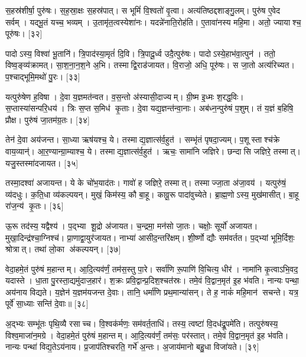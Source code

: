 स॒हस्र॑शीर्\mbox{}षा॒ पुरु॑षः। स॒ह॒स्रा॒क्षः स॒हस्र॑पात्। स भूमिं॑ वि॒श्वतो॑ वृ॒त्वा। अत्य॑तिष्ठद्दशाङ्गु॒लम्। पुरु॑ष ए॒वेद सर्वम्। यद्भू॒तं यच्च॒ भव्यम्। उ॒तामृ॑त॒त्वस्येशा॑नः। यदन्ने॑नाति॒रोह॑ति। ए॒तावा॑नस्य महि॒मा। अतो॒ ज्यायाश्च॒ पूरु॑षः। [३२]

पादोऽस्य॒ विश्वा॑ भू॒तानि॑। त्रि॒पाद॑स्या॒मृतं॑ दि॒वि। त्रि॒पादू॒र्ध्व उदै॒त्पुरु॑षः। पादोऽस्ये॒हाभ॑वा॒त्पुन॑। ततो॒ विष्व॒ङ्व्य॑क्रामत्। सा॒श॒ना॒न॒श॒ने अ॒भि। तस्माद्वि॒राड॑जायत। वि॒राजो॒ अधि॒ पूरु॑षः। स जा॒तो अत्य॑रिच्यत। प॒श्चाद्भूमि॒मथो॑ पु॒रः। [३३]

यत्पुरु॑षेण ह॒विषा। दे॒वा य॒ज्ञमत॑न्वत। व॒स॒न्तो अ॑स्यासी॒दाज्यम्। ग्री॒ष्म इ॒ध्मः  श॒रद्ध॒विः। स॒प्तास्या॑सन्परि॒धय॑। त्रिः स॒प्त स॒मिध॑ कृ॒ताः। दे॒वा यद्य॒ज्ञन्त॑न्वा॒नाः। अब॑ध्न॒न्पुरु॑षं प॒शुम्। तं य॒ज्ञं ब॒\ar{}हिषि॒ प्रौक्ष\sn{}। पुरु॑षं जा॒तम॑ग्र॒तः। [३४]

तेन॑ दे॒वा अय॑जन्त। सा॒ध्या ऋष॑यश्च॒ ये। तस्माद्य॒ज्ञात्स॑र्व॒हुत॑। सम्भृ॑तं पृषदा॒ज्यम्। प॒शूस्ताश्च॑क्रे वाय॒व्यान्॑। आ॒र॒ण्यान्ग्रा॒म्याश्च॒ ये। तस्माद्य॒ज्ञात्स॑र्व॒हुत॑। ऋचः॒ सामा॑नि जज्ञिरे। छन्दासि जज्ञिरे॒ तस्मात्। यजु॒स्तस्मा॑दजायत। [३५]

तस्मा॒दश्वा॑ अजायन्त। ये के चो॑भ॒याद॑तः। गावो॑ ह जज्ञिरे॒ तस्मात्। तस्माज्जा॒ता अ॑जा॒वय॑। यत्पुरु॑षं॒ व्य॑दधुः। क॒ति॒धा व्य॑कल्पयन्। मुखं॒ किम॑स्य॒ कौ बा॒हू। कावू॒रू पादा॑वुच्येते। ब्रा॒ह्म॒णोऽस्य॒ मुख॑मासीत्। बा॒हू रा॑ज॒न्य॑ कृ॒तः। [३६]

ऊ॒रू तद॑स्य॒ यद्वैश्य॑। प॒द्भ्या शू॒द्रो अ॑जायत। च॒न्द्रमा॒ मन॑सो जा॒तः। चक्षोः॒ सूर्यो॑ अजायत। मुखा॒दिन्द्र॑श्चा॒ग्निश्च॑। प्रा॒णाद्वा॒युर॑जायत। नाभ्या॑ आसीद॒न्तरि॑क्षम्। शी॒र्ष्णो द्यौः सम॑वर्तत। प॒द्भ्यां भूमि॒र्दिशः॒ श्रोत्रात्। तथा॑ लो॒का अ॑कल्पयन्। [३७]

वेदा॒हमे॒तं पुरु॑षं म॒हान्तम्। आ॒दि॒त्यव॑र्णं॒ तम॑स॒स्तु पा॒रे। सर्वा॑णि रू॒पाणि॑ वि॒चित्य॒ धीर॑। नामा॑नि कृ॒त्वाऽभि॒वद॒\an{} यदास्ते। धा॒ता पु॒रस्ता॒द्यमु॑दाज॒हार॑। श॒क्रः प्रवि॒द्वान्प्र॒दिश॒श्चत॑स्रः। तमे॒वं वि॒द्वान॒मृत॑ इ॒ह भ॑वति। नान्यः पन्था॒ अय॑नाय विद्यते। य॒ज्ञेन॑ य॒ज्ञम॑यजन्त दे॒वाः। तानि॒ धर्मा॑णि प्रथ॒मान्या॑सन्। ते ह॒ नाकं॑ महि॒मान॑ सचन्ते। यत्र॒ पूर्वे॑ सा॒ध्याः सन्ति॑ दे॒वाः॥ [३८]

अ॒द्भ्यः सम्भू॑तः पृथि॒व्यै रसाच्च। वि॒श्वक॑र्मणः॒ सम॑वर्त॒ताधि॑। तस्य॒ त्वष्टा॑ वि॒दध॑द्रू॒पमे॑ति। तत्पुरु॑षस्य॒ विश्व॒माजा॑न॒मग्रे। वेदा॒हमे॒तं पुरु॑षं म॒हान्तम्। आ॒दि॒त्यव॑र्णं॒ तम॑सः॒ पर॑स्तात्। तमे॒वं वि॒द्वान॒मृत॑ इ॒ह भ॑वति। नान्यः पन्था॑ विद्य॒तेऽय॑नाय। प्र॒जाप॑तिश्चरति॒ गर्भे॑ अ॒न्तः। अ॒जाय॑मानो बहु॒धा विजा॑यते। [३९]

